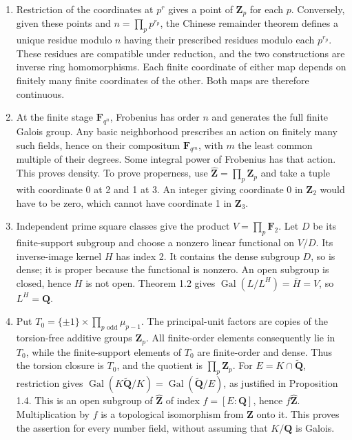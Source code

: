 \documentclass[11pt,a4paper]{article}
\newcommand{\tightlist}{\setlength{\itemsep}{0pt}\setlength{\parskip}{0pt}}
\begin{document}
\begin{enumerate}
\def\labelenumi{\arabic{enumi}.}
\tightlist
\item
  Restriction of the coordinates at \(p^r\) gives a point of
  \(\mathbf Z_p\) for each \(p\). Conversely, given these points and
  \(n=\prod_p p^{r_p}\), the Chinese remainder theorem defines a unique
  residue modulo \(n\) having their prescribed residues modulo each
  \(p^{r_p}\). These residues are compatible under reduction, and the
  two constructions are inverse ring homomorphisms. Each finite
  coordinate of either map depends on finitely many finite coordinates
  of the other. Both maps are therefore continuous.
\item
  At the finite stage \(\mathbf F_{q^n}\), Frobenius has order \(n\) and
  generates the full finite Galois group. Any basic neighborhood
  prescribes an action on finitely many such fields, hence on their
  compositum \(\mathbf F_{q^m}\), with \(m\) the least common multiple
  of their degrees. Some integral power of Frobenius has that action.
  This proves density. To prove properness, use
  \(\widehat{\mathbf Z}=\prod_p\mathbf Z_p\) and take a tuple with
  coordinate 0 at 2 and 1 at 3. An integer giving coordinate 0 in
  \(\mathbf Z_2\) would have to be zero, which cannot have coordinate 1
  in \(\mathbf Z_3\).
\item
  Independent prime square classes give the product
  \(V=\prod_p\mathbf F_2\). Let \(D\) be its finite-support subgroup and
  choose a nonzero linear functional on \(V/D\). Its inverse-image
  kernel \(H\) has index 2. It contains the dense subgroup \(D\), so is
  dense; it is proper because the functional is nonzero. An open
  subgroup is closed, hence \(H\) is not open. Theorem 1.2 gives
  \(\operatorname{Gal}(L/L^H)=\overline H=V\), so \(L^H=\mathbf Q\).
\item
  Put \(T_0=\{\pm1\}\times\prod_{p\text{ odd}}\mu_{p-1}\). The
  principal-unit factors are copies of the torsion-free additive groups
  \(\mathbf Z_p\). All finite-order elements consequently lie in
  \(T_0\), while the finite-support elements of \(T_0\) are finite-order
  and dense. Thus the torsion closure is \(T_0\), and the quotient is
  \(\prod_p\mathbf Z_p\). For \(E=K\cap\widetilde{\mathbf Q}\),
  restriction gives
  \(\operatorname{Gal}(K\widetilde{\mathbf Q}/K)=\operatorname{Gal}(\widetilde{\mathbf Q}/E)\),
  as justified in Proposition 1.4. This is an open subgroup of
  \(\widehat{\mathbf Z}\) of index \(f=[E:\mathbf Q]\), hence
  \(f\widehat{\mathbf Z}\). Multiplication by \(f\) is a topological
  isomorphism from \(\widehat{\mathbf Z}\) onto it. This proves the
  assertion for every number field, without assuming that
  \(K/\mathbf Q\) is Galois.
\end{enumerate}
\end{document}
